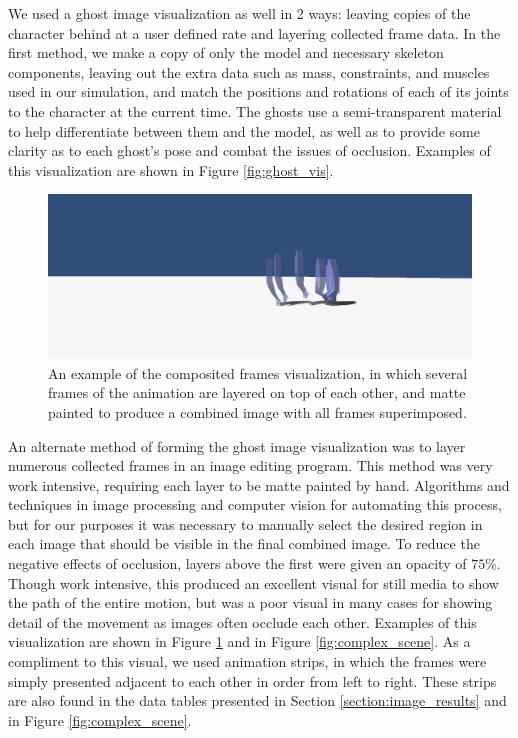We used a ghost image visualization as well in 2 ways: leaving copies of the character behind at a user defined rate and layering collected frame data.  In the first method, we make a copy of only the model and necessary skeleton components, leaving out the extra data such as mass, constraints, and muscles used in our simulation, and match the positions and rotations of each of its joints to the character at the current time.  The ghosts use a semi-transparent material to help differentiate between them and the model, as well as to provide some clarity as to each ghost's pose and combat the issues of occlusion.  Examples of this visualization are shown in Figure \ref{fig:ghost_vis}.

\begin{figure}[ht]
	\centering
	\includegraphics[width=\textwidth]{images/k200kvaryingcomposite.png}
	\caption[Composite frame visualization]{An example of the composited frames visualization, in which several frames of the animation are layered on top of each other, and matte painted to produce a combined image with all frames superimposed.}
	\label{fig:composite_vis}
\end{figure}

An alternate method of forming the ghost image visualization was to layer numerous collected frames in an image editing program.  This method was very work intensive, requiring each layer to be matte painted by hand.  Algorithms and techniques in image processing and computer vision for automating this process, but for our purposes it was necessary to manually select the desired region in each image that should be visible in the final combined image.  To reduce the negative effects of occlusion, layers above the first were given an opacity of $75\%$.  Though work intensive, this produced an excellent visual for still media to show the path of the entire motion, but was a poor visual in many cases for showing detail of the movement as images often occlude each other.  Examples of this visualization are shown in Figure \ref{fig:composite_vis} and in Figure \ref{fig:complex_scene}.  As a compliment to this visual, we used animation strips, in which the frames were simply presented adjacent to each other in order from left to right.  These strips are also found in the data tables presented in Section \ref{section:image_results} and in Figure \ref{fig:complex_scene}.

